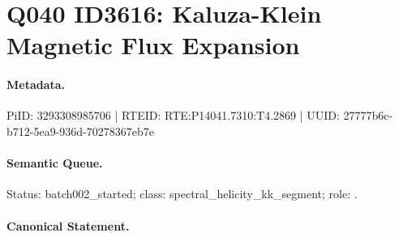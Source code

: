 \section*{Q040 ID3616: Kaluza-Klein Magnetic Flux Expansion}
\paragraph{Metadata.}
PiID: 3293308985706 | RTEID: RTE:P14041.7310:T4.2869 | UUID: 27777b6c-b712-5ea9-936d-70278367eb7e

\paragraph{Semantic Queue.}
Status: batch002\_started; class: spectral\_helicity\_kk\_segment; role: .

\paragraph{Canonical Statement.}
